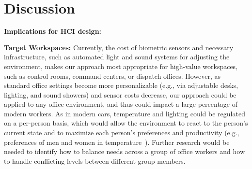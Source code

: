 \section{Discussion}
\textbf{Implications for HCI design:}


\vspace{0.05in}
\noindent
\textbf{Target Workspaces:}
Currently, the cost of biometric sensors and necessary infrastructure, such as automated light and sound systems for adjusting the environment, makes our approach most appropriate for high-value workspaces, such as control rooms, command centers, or dispatch offices. However, as standard office settings become more personalizable (e.g., via adjustable desks, lighting, and sound showers) and sensor costs decrease, our approach could be applied to any office environment, and thus could impact a large percentage of modern workers. As in modern cars, temperature and lighting could be regulated on a per-person basis, which would allow the environment to react to the person's current state and to maximize each person's preferences and productivity (e.g., preferences of men and women in temperature~\cite{Karjalainen07}). Further research would be needed to identify how to balance needs across a group of office workers and how to handle conflicting levels between different group members.

